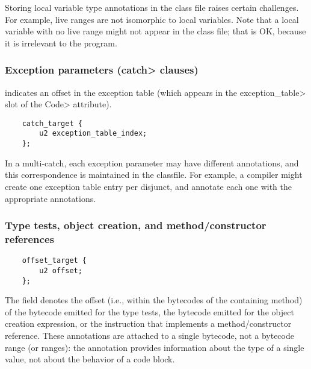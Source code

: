\documentclass[10pt]{article}
\newcommand{\preverbnegspace}{\vspace{-5pt}}
\begin{document}
Storing local variable type annotations in the class file raises certain
challenges.  For example, live ranges are not isomorphic to local
variables.  Note that a local variable with no live range might not appear in
the class file; that is OK, because it is irrelevant to the program.



\subsubsection{Exception parameters (\<catch> clauses)\label{class-file:ext:ri:catch}}

 indicates an offset in the exception table (which
appears in the \<exception\_table> slot of the \<Code> attribute).

\preverbnegspace
\begin{Verbatim}
    catch_target {
        u2 exception_table_index;
    };
\end{Verbatim}

In a multi-catch, each exception parameter may have different annotations,
and this correspondence is maintained in the classfile.  For example, a
compiler might create one exception table entry per disjunct, and annotate
each one with the appropriate annotations.



\subsubsection{Type tests, object creation, and method/constructor references\label{class-file:ext:ri:instanceof}\label{class-file:ext:ri:new}\label{class-file:ext:ri:mref-receiver}\label{class-file:ext:ri:cref-receiver}}


\preverbnegspace
\begin{Verbatim}
    offset_target {
        u2 offset;
    };
\end{Verbatim}

The  field denotes the offset (i.e., within the bytecodes
of the containing method) of the  bytecode emitted for the type tests,
the  bytecode emitted for the object creation expression, or the
instruction that implements a method/constructor reference.
These annotations are attached to a single bytecode, not a bytecode range
(or ranges):  the annotation provides information about the type of a
single value, not about the behavior of a code block.
\end{document}
